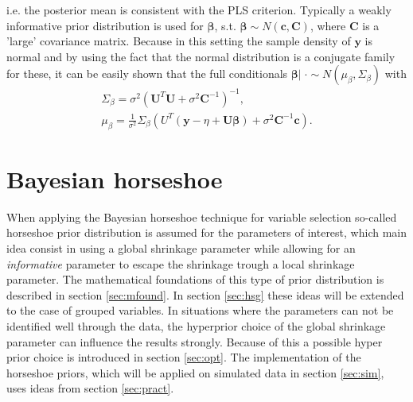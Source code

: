 \documentclass[12pt,letterpaper]{article}
\numberwithin{equation}{subsection}
\begin{document}
i.e. the posterior mean is consistent with the PLS criterion. Typically a weakly informative prior distribution is used for $\mathbf{\beta}$, s.t. $\mathbf{\beta} \sim N(\mathbf{c},\mathbf{C})$, where $\mathbf{C}$ is a 'large' covariance matrix. Because in this setting the sample density of $\mathbf{y}$ is normal and by using the fact that the normal distribution is a conjugate family for these, it can be easily shown that the full conditionals $\mathbf{\beta} |\; \cdot \sim N(\mu_\beta, \Sigma_\beta)$ with
\begin{align}
\Sigma_\beta = \sigma^2(\mathbf{U}^T\mathbf{U} + \sigma^2 \mathbf{C}^{-1})^{-1}, \\
\mu_\beta = \frac{1}{\sigma^2}\Sigma_\beta(U^T(\mathbf{y} - \eta + \mathbf{U}\mathbf{\beta}) + \sigma^2\mathbf{C}^{-1}\mathbf{c}).
\label{eq:mubeta}
\end{align}


\label{sec:AddMod}
\pagebreak

\section{Bayesian horseshoe}
When applying the Bayesian horseshoe technique for variable selection so-called horseshoe prior distribution is assumed for the parameters of interest, which main idea consist in using a global shrinkage parameter while allowing for an \textit{informative} parameter to escape the shrinkage trough a local shrinkage parameter. The mathematical foundations of this type of prior distribution is described in section \ref{sec:mfound}. In section \ref{sec:hsg} these ideas will be extended to the case of grouped variables. In situations where the parameters can not be identified well through the data, the hyperprior choice of the global shrinkage parameter can influence the results strongly. Because of this a possible hyper prior choice is introduced in section \ref{sec:opt}. The implementation of the horseshoe priors, which will be applied on simulated data in section \ref{sec:sim}, uses ideas from section \ref{sec:pract}.
\end{document}
